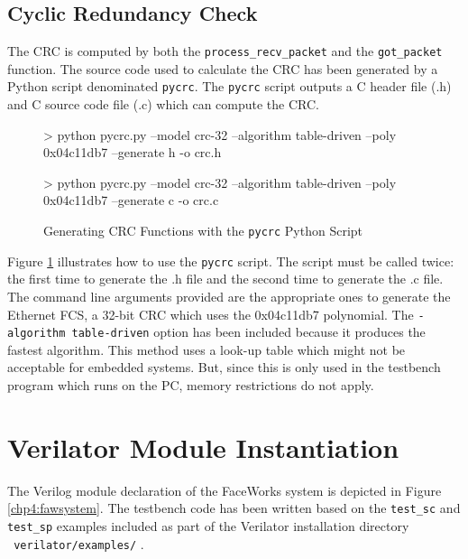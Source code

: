 \documentclass[defaultstyle,10pt,master,Helvetica]{thesis}
\begin{document}
\subsection{Cyclic Redundancy Check}
\label{subsec:CRC}
The \ac{CRC} is computed by both the \texttt{process\_recv\_packet} and the \texttt{got\_packet} function. The source code used to calculate the \ac{CRC} has been generated by a Python script denominated \texttt{pycrc}\cite{pycrc}. The \texttt{pycrc} script outputs  a C header file (.h) and C source code file (.c) which can compute the CRC. 

\begin{figure}[h]
\begin{boxedverbatim}
> python pycrc.py --model crc-32 --algorithm table-driven --poly 0x04c11db7 --generate h -o crc.h

> python pycrc.py --model crc-32 --algorithm table-driven --poly 0x04c11db7 --generate c -o crc.c
\end{boxedverbatim}
\caption{Generating \ac{CRC} Functions with the {\tt pycrc} Python Script}
\label{chp4:crcgen}
\end{figure}

Figure \ref{chp4:crcgen} illustrates how to use the \texttt{pycrc} script. The script must be called twice: the first time to generate the .h file and the second time to generate the .c file. The command line arguments provided are the appropriate ones to generate the Ethernet \ac{FCS}, a 32-bit CRC which uses the 0x04c11db7 polynomial. The {\tt -algorithm table-driven} option has been included because it produces the fastest algorithm. This method uses a look-up table which might not be acceptable for embedded systems. But, since this is only used in the testbench program which runs on the PC, memory restrictions do not apply.


\section{Verilator Module Instantiation}
\label{sec:vermodinst}
The Verilog module declaration of the FaceWorks system is depicted in Figure \ref{chp4:fawsystem}. The testbench code has been written based on the {\tt test\_sc} and {\tt test\_sp} examples included as part of the Verilator installation directory {\tt ~verilator/examples/} \cite{verilatorman}.
\end{document}
